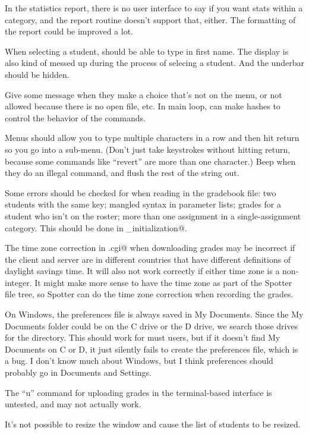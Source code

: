 \documentclass{opengrade_doc}
\begin{document}
In the statistics report, there is no user interface to say if you want
stats within a category, and the report routine doesn't support that,
either. The formatting of the report could be improved a lot.

When selecting a student, should be able to type in first name.
The display is also kind of messed up during the process of selecing
a student. And the underbar should be hidden.


Give some message when they make a choice that's
not on the menu, or not allowed because there is no open file, etc.
In main loop, can make hashes to control the behavior of the commands.

Menus should allow you to type multiple characters in a row and then
hit return so you go into a sub-menu. (Don't just take keystrokes without
hitting return, because some commands like ``revert'' are more than
one character.) Beep when they do an illegal command, and flush the
rest of the string out.

\label{bugs}
Some errors should be checked for when reading in the gradebook
file: two students with the same key; mangled syntax in parameter
lists; grades for a student who isn't on the roster; more than one
assignment in a single-assignment category.
This should be done in \verb@misc_initialization@.

The time zone correction in \verb@ServerOG.cgi@
when downloading grades may be incorrect if the client and
server are in different countries that have different definitions
of daylight savings time. It will also not work correctly if either
time zone is a non-integer. It might make more sense to have the time
zone as part of the Spotter file tree, so Spotter can do the time
zone correction when recording the grades.

On Windows, the preferences file is always saved in My Documents. Since
the My Documents folder could be on the C drive or the D drive, we search
those drives for the directory. This should work for must users, but if
it doesn't find My Documents on C or D, it just silently fails to create
the preferences file, which is a bug. I don't know much about Windows,
but I think preferences should probably go in Documents and Settings.

The ``u'' command for uploading grades in the terminal-based interface is
untested, and may not actually work.

It's not possible to resize the window and cause the list of students to be
resized.
\end{document}
